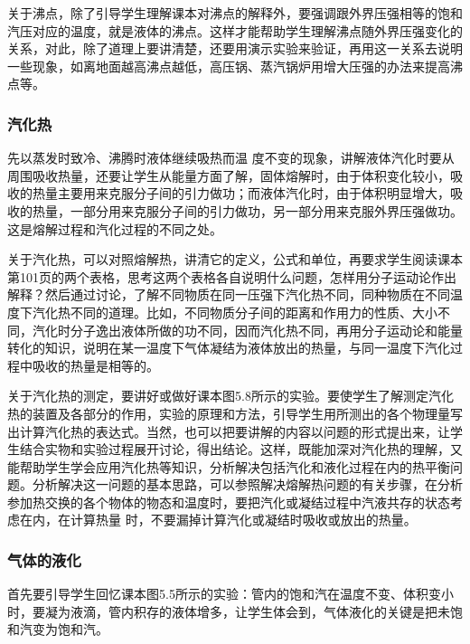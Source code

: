 关于沸点，除了引导学生理解课本对沸点的解释外，要强调跟外界压强相等的饱和汽压对应的温度，就是液体的沸点。这样才能帮助学生理解沸点随外界压强变化的关系，对此，除了道理上要讲清楚，还要用演示实验来验证，再用这一关系去说明一些现象，如离地面越高沸点越低，高压锅、蒸汽锅炉用增大压强的办法来提高沸点等。

\subsubsection{汽化热} 

先以蒸发时致冷、沸腾时液体继续吸热而温
度不变的现象，讲解液体汽化时要从周围吸收热量，还要让学生从能量方面了解，固体熔解时，由于体积变化较小，吸收的热量主要用来克服分子间的引力做功；而液体汽化时，由于体积明显增大，吸收的热量，一部分用来克服分子间的引力做功，另一部分用来克服外界压强做功。这是熔解过程和汽化过程的不同之处。

关于汽化热，可以对照熔解热，讲清它的定义，公式和单位，再要求学生阅读课本第101页的两个表格，思考这两个表格各自说明什么问题，怎样用分子运动论作出解释？然后通过讨论，了解不同物质在同一压强下汽化热不同，同种物质在不同温度下汽化热不同的道理。比如，不同物质分子间的距离和作用力的性质、大小不同，汽化时分子逸出液体所做的功不同，因而汽化热不同，再用分子运动论和能量转化的知识，说明在某一温度下气体凝结为液体放出的热量，与同一温度下汽化过程中吸收的热量是相等的。

关于汽化热的测定，要讲好或做好课本图5.8所示的实验。要使学生了解测定汽化热的装置及各部分的作用，实验的原理和方法，引导学生用所测出的各个物理量写出计算汽化热的表达式。当然，也可以把要讲解的内容以问题的形式提出来，让学生结合实物和实验过程展开讨论，得出结论。这样，既能加深对汽化热的理解，又能帮助学生学会应用汽化热等知识，分析解决包括汽化和液化过程在内的热平衡问题。分析解决这一问题的基本思路，可以参照解决熔解热问题的有关步骤，在分析参加热交换的各个物体的物态和温度时，要把汽化或凝结过程中汽液共存的状态考虑在内，在计算热量
时，不要漏掉计算汽化或凝结时吸收或放出的热量。

\subsubsection{气体的液化}

首先要引导学生回忆课本图5.5所示的实验：管内的饱和汽在温度不变、体积变小时，要凝为液滴，管内积存的液体增多，让学生体会到，气体液化的关键是把未饱和汽变为饱和汽。

